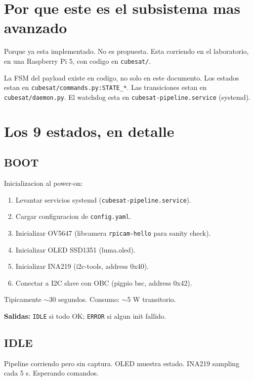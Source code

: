 \documentclass[11pt,a4paper,oneside,openright]{book}
\begin{document}
\section{Por que este es el subsistema mas avanzado}

Porque ya esta implementado. No es propuesta. Esta corriendo en el
laboratorio, en una Raspberry Pi 5, con codigo en
\texttt{cubesat/}.

\begin{logrado}
La FSM del payload existe en codigo, no solo en este documento. Los
estados estan en \texttt{cubesat/commands.py:STATE\_*}. Las
transiciones estan en \texttt{cubesat/daemon.py}. El watchdog esta
en \texttt{cubesat-pipeline.service} (systemd).
\end{logrado}

\section{Los 9 estados, en detalle}

\subsection*{BOOT}

Inicializacion al power-on:

\begin{enumerate}[leftmargin=2em]
  \item Levantar servicios systemd (\texttt{cubesat-pipeline.service}).
  \item Cargar configuracion de \texttt{config.yaml}.
  \item Inicializar OV5647 (libcamera \texttt{rpicam-hello} para
    sanity check).
  \item Inicializar OLED SSD1351 (luma.oled).
  \item Inicializar INA219 (i2c-tools, address 0x40).
  \item Conectar a I2C slave con OBC (pigpio bsc, address 0x42).
\end{enumerate}

Tipicamente $\sim$30 segundos. Consumo: $\sim$5 W transitorio.

\textbf{Salidas:} \texttt{IDLE} si todo OK; \texttt{ERROR} si algun
init fallido.

\subsection*{IDLE}

Pipeline corriendo pero sin captura. OLED muestra estado. INA219
sampling cada 5 s. Esperando comandos.
\end{document}
